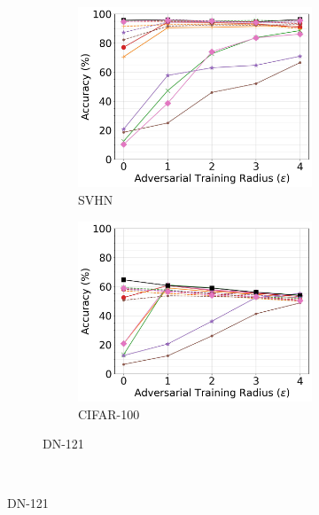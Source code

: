 \documentclass[conference]{IEEEtran}
\theoremstyle{definition}
\theoremstyle{remark}
\theoremstyle{proposition}
\begin{document}
\begin{figure}[p!]
\begin{subfigure}{1.0\textwidth}
	\begin{subfigure}{.3\textwidth}
		\centering
		\includegraphics[width=1.0\textwidth]{DN-121_AT_SVHN.jpg}
		\caption*{SVHN}
		\label{fig:at_svhn:dn121}
	\end{subfigure}\hspace*{0.75em}
	\begin{subfigure}{.3\textwidth}
		\centering
		\includegraphics[width=1.0\textwidth]{DN-121_AT_CIFAR-100.jpg}
		\caption*{CIFAR-100}
		\label{fig:at_cifar100:dn121}
	\end{subfigure}
    \caption{DN-121}
	\label{fig:at_dn121}
    \end{subfigure}\\\vspace*{0.5em}

\end{figure}
\end{document}
